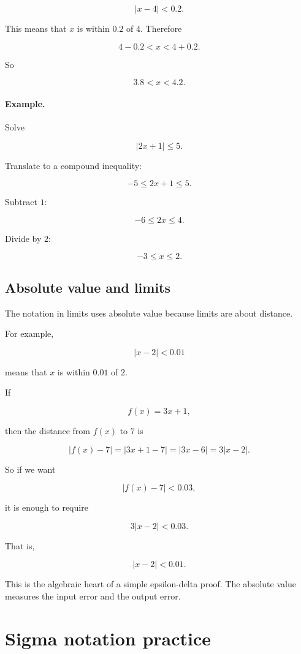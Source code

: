 \[
|x-4|<0.2.
\]

This means that \(x\) is within \(0.2\) of \(4\).  Therefore

\[
4-0.2<x<4+0.2.
\]

So

\[
\boxed{
3.8<x<4.2.
}
\]

\paragraph{Example.}
Solve

\[
|2x+1|\le5.
\]

Translate to a compound inequality:

\[
-5\le2x+1\le5.
\]

Subtract \(1\):

\[
-6\le2x\le4.
\]

Divide by \(2\):

\[
\boxed{
-3\le x\le2.
}
\]

\subsection{Absolute value and limits}
\label{appsubsec:absolute-value-limits}

The notation in limits uses absolute value because limits are about distance.

For example,

\[
|x-2|<0.01
\]

means that \(x\) is within \(0.01\) of \(2\).

If

\[
f(x)=3x+1,
\]

then the distance from \(f(x)\) to \(7\) is

\[
|f(x)-7|
=
|3x+1-7|
=
|3x-6|
=
3|x-2|.
\]

So if we want

\[
|f(x)-7|<0.03,
\]

it is enough to require

\[
3|x-2|<0.03.
\]

That is,

\[
|x-2|<0.01.
\]

This is the algebraic heart of a simple epsilon-delta proof.  The absolute value measures
the input error and the output error.

\section{Sigma notation practice}
\label{appsec:sigma-notation-practice}

